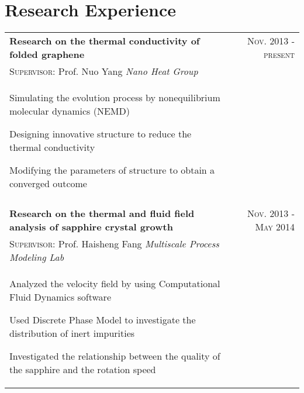 \documentclass[a4paper,10pt]{article}
\begin{document}
\section{Research Experience}
\begin{tabular}{p{14cm}r}
\textbf{Research on the thermal conductivity of folded graphene}  &\textsc{Nov. 2013} - \textsc{present} \\
\hspace{1em}\textsc{Supervisor:} Prof. Nuo Yang \hspace{9em} \emph{Nano Heat Group} & \vspace{-0.5em}\\
\begin{compactitem}
       \item Simulating the evolution process by nonequilibrium molecular dynamics (NEMD)\vspace{0.2em}
       \item Designing innovative structure to reduce the thermal conductivity\vspace{0.2em}
       \item Modifying the parameters of structure to obtain a converged outcome
     \end{compactitem}&\vspace{-2.2em} \\
\multicolumn{2}{c}{} \\
\textbf{Research on the thermal and fluid field analysis of sapphire crystal growth}  &\textsc{Nov. 2013 - May 2014} \\
\hspace{1em} \textsc{Supervisor:} Prof. Haisheng Fang \hspace{6em} \emph{Multiscale Process Modeling Lab}  & \vspace{-0.5em} \\
\begin{compactitem}
       \item Analyzed the velocity field by using Computational Fluid Dynamics software\vspace{0.2em}
       \item Used Discrete Phase Model to investigate the distribution of inert impurities\vspace{0.2em}
       \item Investigated the relationship between the quality of the sapphire and the rotation speed
     \end{compactitem}&\vspace{-2.2em} \\

\end{tabular}
\end{document}

